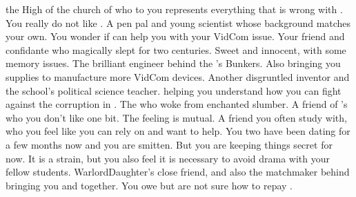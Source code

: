 \documentclass[char]{GL2020}
\begin{document}
\begin{contacts}
    \contact{\cAntiChup{}} the High \cAntiChup{\Cleric} of the church of \cTechGod{} who to you represents everything that is wrong with \pTech{}. You really do not like \cAntiChup{\them}. 
    \contact {\cAssistantScientist{}} A pen pal and young scientist whose background matches your own. You wonder if \cAssistantScientist{\they} can help you with your VidCom issue.
    \contact{\cDisney{}} Your friend and confidante who magically slept for two centuries. Sweet and innocent, with some memory issues.
    \contact{\cBunker{}} The brilliant engineer behind the \pSc{}'s Bunkers. Also bringing you supplies to manufacture more VidCom devices.
    \contact{\cChupInventor{}} Another disgruntled inventor and the school’s political science teacher. \cChupInventor{\Theyare} helping you understand how you can fight against the corruption in \pEarth{}.
    \contact{\cWildCard{}} The \cWildCard{\person} who woke \cDisney{} from \cDisney{\their} enchanted slumber. 
    \contact{\cPirateChild{}} A friend of \cDisney{}'s who you don't like one bit. The feeling is mutual.
    \contact{\cScholarship{}} A friend you often study with, who you feel like you can rely on and want to help.
    \contact{\cWarlordDaughter{}} You two have been dating for a few months now and you are smitten. But you are keeping things secret for now. It is a strain, but you also feel it is necessary to avoid drama with your fellow students.
    \contact {\cInitiate{}} WarlordDaughter{}’s close friend, and also the matchmaker behind bringing you and \cWarlordDaughter{} together. You owe \cInitiate{} but are not sure how to repay \cInitiate{\them}. 
\end{contacts}
\end{document}
